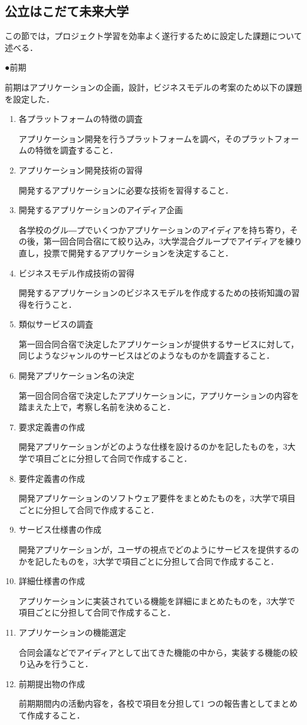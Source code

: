 \subsection{公立はこだて未来大学}
\par この節では，プロジェクト学習を効率よく遂行するために設定した課題について述べる．
\par ●前期
\par 前期はアプリケーションの企画，設計，ビジネスモデルの考案のため以下の課題を設定した．
\begin{enumerate}
\item 各プラットフォームの特徴の調査
\par アプリケーション開発を行うプラットフォームを調べ，そのプラットフォームの特徴を調査すること．
\item アプリケーション開発技術の習得 
\par 開発するアプリケーションに必要な技術を習得すること．
\item 開発するアプリケーションのアイディア企画
\par 各学校のグル―プでいくつかアプリケーションのアイディアを持ち寄り，その後，第一回合同合宿にて絞り込み，3大学混合グループでアイディアを練り直し，投票で開発するアプリケーションを決定すること．
\item ビジネスモデル作成技術の習得
\par 開発するアプリケーションのビジネスモデルを作成するための技術知識の習得を行うこと．
\item 類似サービスの調査
\par 第一回合同合宿で決定したアプリケーションが提供するサービスに対して，同じようなジャンルのサービスはどのようなものかを調査すること．\item 開発アプリケーション名の決定
\par 第一回合同合宿で決定したアプリケーションに，アプリケーションの内容を踏まえた上で，考察し名前を決めること．
\item 要求定義書の作成
\par 開発アプリケーションがどのような仕様を設けるのかを記したものを，3大学で項目ごとに分担して合同で作成すること．
\item 要件定義書の作成
\par 開発アプリケーションのソフトウェア要件をまとめたものを，3大学で項目ごとに分担して合同で作成すること．
\item サービス仕様書の作成
\par 開発アプリケーションが，ユーザの視点でどのようにサービスを提供するのかを記したものを，3大学で項目ごとに分担して合同で作成すること．
\item 詳細仕様書の作成
\par アプリケーションに実装されている機能を詳細にまとめたものを，3大学で項目ごとに分担して合同で作成すること．
\item アプリケーションの機能選定
\par 合同会議などでアイディアとして出てきた機能の中から，実装する機能の絞り込みを行うこと．
\item  前期提出物の作成
\par 前期期間内の活動内容を，各校で項目を分担して1 つの報告書としてまとめて作成すること．
\end{enumerate}

